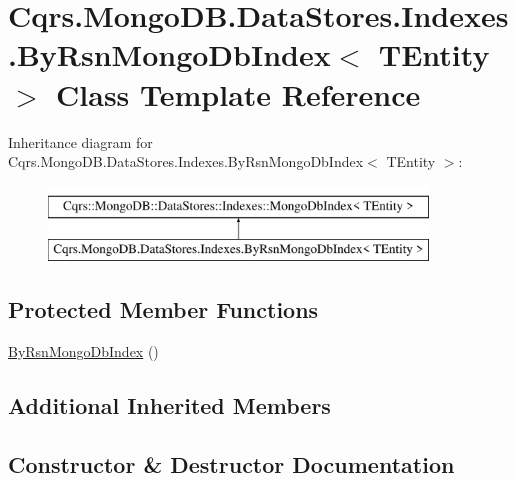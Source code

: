 \hypertarget{classCqrs_1_1MongoDB_1_1DataStores_1_1Indexes_1_1ByRsnMongoDbIndex}{}\section{Cqrs.\+Mongo\+D\+B.\+Data\+Stores.\+Indexes.\+By\+Rsn\+Mongo\+Db\+Index$<$ T\+Entity $>$ Class Template Reference}
\label{classCqrs_1_1MongoDB_1_1DataStores_1_1Indexes_1_1ByRsnMongoDbIndex}
Inheritance diagram for Cqrs.\+Mongo\+D\+B.\+Data\+Stores.\+Indexes.\+By\+Rsn\+Mongo\+Db\+Index$<$ T\+Entity $>$\+:\begin{figure}[H]
\begin{center}
\leavevmode
\includegraphics[height=2.000000cm]{classCqrs_1_1MongoDB_1_1DataStores_1_1Indexes_1_1ByRsnMongoDbIndex}
\end{center}
\end{figure}
\subsection*{Protected Member Functions}
\begin{DoxyCompactItemize}
\item 
\hyperlink{classCqrs_1_1MongoDB_1_1DataStores_1_1Indexes_1_1ByRsnMongoDbIndex_acf6c8317e8ff8d9c3ffa592683e30665_acf6c8317e8ff8d9c3ffa592683e30665}{By\+Rsn\+Mongo\+Db\+Index} ()
\end{DoxyCompactItemize}
\subsection*{Additional Inherited Members}


\subsection{Constructor \& Destructor Documentation}
\mbox{\label{classCqrs_1_1MongoDB_1_1DataStores_1_1Indexes_1_1ByRsnMongoDbIndex_acf6c8317e8ff8d9c3ffa592683e30665_acf6c8317e8ff8d9c3ffa592683e30665}} 
